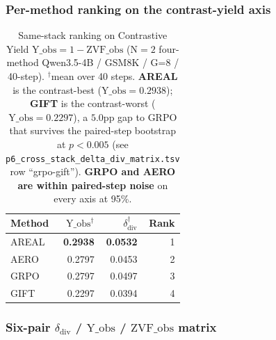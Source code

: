 \documentclass{article}
\begin{document}
\subsubsection{Per-method ranking on the contrast-yield axis}

\begin{table}[h]
\centering
\small
\begin{tabular}{l r r r}
\toprule
\textbf{Method} & $\mathrm{Y\_obs}^{\dagger}$ & $\delta_{\mathrm{div}}^{\dagger}$ & Rank \\
\midrule
AREAL & \textbf{0.2938} & \textbf{0.0532} & 1 \\
AERO  & 0.2797 & 0.0453 & 2 \\
GRPO  & 0.2797 & 0.0497 & 3 \\
GIFT  & 0.2297 & 0.0394 & 4 \\
\bottomrule
\end{tabular}
\caption{Same-stack ranking on Contrastive Yield
$\mathrm{Y\_obs}=1-\mathrm{ZVF\_obs}$
($\mathrm{N\!=\!2}$ four-method Qwen3.5-4B / GSM8K / G=8 / 40-step).
$^{\dagger}$mean over 40 steps.
\textbf{AREAL} is the contrast-best ($\mathrm{Y\_obs}=0.2938$);
\textbf{GIFT} is the contrast-worst ($\mathrm{Y\_obs}=0.2297$),
a $5.0$pp gap to GRPO that survives the paired-step bootstrap at $p<0.005$
(see \texttt{p6\_cross\_stack\_delta\_div\_matrix.tsv} row
``grpo-gift'').
\textbf{GRPO and AERO are within paired-step noise} on every axis at 95\%.}
\label{tab:p6-iter86-rank}
\end{table}

\subsubsection{Six-pair $\delta_{\mathrm{div}}$ / $\mathrm{Y\_obs}$ / $\mathrm{ZVF\_obs}$ matrix}
\end{document}
